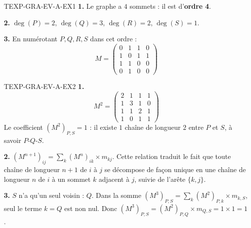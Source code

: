 \begin{corrige}{TEXP-GRA-EV-A-EX1}
\textbf{1.} Le graphe a $4$ sommets : il est d'\textbf{ordre 4}.

\textbf{2.} $\deg(P)=2$, $\deg(Q)=3$, $\deg(R)=2$, $\deg(S)=1$.

\textbf{3.} En numérotant $P,Q,R,S$ dans cet ordre :
$$M=\begin{pmatrix}0&1&1&0\\1&0&1&1\\1&1&0&0\\0&1&0&0\end{pmatrix}$$
\end{corrige}

\begin{corrige}{TEXP-GRA-EV-A-EX2}
\textbf{1.}
$$M^2=\begin{pmatrix}2&1&1&1\\1&3&1&0\\1&1&2&1\\1&0&1&1\end{pmatrix}$$
Le coefficient $(M^2)_{P,S}=1$ : il existe $1$ chaîne de longueur $2$ entre $P$ et $S$, à savoir $P\text{-}Q\text{-}S$.

\textbf{2.} $(M^{n+1})_{ij}=\displaystyle\sum_{k}(M^n)_{ik}\times m_{kj}$. Cette relation traduit le fait que toute chaîne de longueur $n+1$ de $i$ à $j$ se décompose de façon unique en une chaîne de longueur $n$ de $i$ à un sommet $k$ adjacent à $j$, suivie de l'arête $\{k,j\}$.

\textbf{3.} $S$ n'a qu'un seul voisin : $Q$. Dans la somme $(M^3)_{P,S}=\sum_k(M^2)_{P,k}\times m_{k,S}$, seul le terme $k=Q$ est non nul. Donc $(M^3)_{P,S}=(M^2)_{P,Q}\times m_{Q,S}=1\times1=1$.
\end{corrige}
